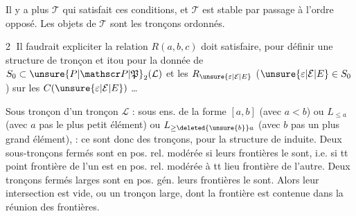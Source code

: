 Il y a  plus  $\mathscr T$ qui satisfait ces conditions, et $\mathscr T$ est stable par passage à l'ordre opposé. Les objets de $\mathscr T$ sont les tronçons ordonnés.

\textcircled{2} Il faudrait expliciter   la relation $R(a,b,c)$ doit satisfaire, pour définir une structure de tronçon \unsure{,} et itou pour la donnée de $S_0\subset\unsure{P|\mathscr P|\mathfrak P}_2(\mathcal L)$ et les $R_{\unsure{\varepsilon|\mathcal E|E}}$\unsure{,} ($\unsure{\varepsilon|\mathcal E|E}\in S_0$) sur les $C(\unsure{\varepsilon|\mathcal E|E})$ \ldots

Sous tronçon  d'un tronçon $\mathcal L$ : sous ens. de la forme $[a,b]$ (avec $a<b$) ou $L_{\leq a}$ (avec $a$ pas le plus petit élément) ou $L_{\geq\deleted{\unsure{b}}a}$ (avec $b$ pas un plus grand élément),  : ce sont donc des tronçons, pour la structure de  induite.
 Deux sous-tronçons fermés sont  en pos. rel. modérée si leurs frontières le sont, i.e. si tt  point frontière de l'un est en pos. rel. modérée à tt lieu frontière de l'autre.
  Deux tronçons fermés larges sont en pos. gén.  leurs frontières  le sont.
Alors leur intersection est vide,  ou un  tronçon large, dont la frontière est contenue dans  la réunion des frontières.


